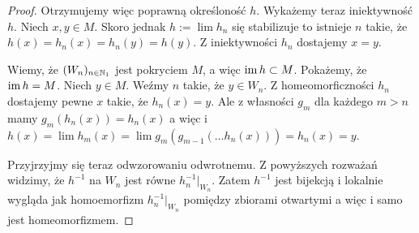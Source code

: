 \begin{thm}
\begin{proof}
    Otrzymujemy więc poprawną określoność $h$. Wykażemy teraz iniektywność $h$. Niech $x, y \in M$. Skoro jednak $h := \lim h_n$ się stabilizuje to istnieje $n$ takie, że $h(x) = h_n(x) = h_n(y) = h(y)$. Z iniektywności $h_n$ dostajemy $x = y$.
    
    Wiemy, że $(W_n)_{n\in{\mathbb{N}_1}}$ jest pokryciem $M$, a więc $\operatorname{im} h \subset M$. Pokażemy, że $\operatorname{im} h = M$. Niech $y\in M$. Weźmy $n$ takie, że $y\in W_n$. Z homeomorficzności $h_n$ dostajemy pewne $x$ takie, że $h_n(x) = y$. Ale z własności $g_m$ dla każdego $m > n$ mamy $g_m(h_n(x)) = h_n(x)$ a więc i $h(x) = \lim h_m(x) = \lim g_m(g_{m-1}(\dots h_n(x))) = h_n(x) = y$.
    
    Przyjrzyjmy się teraz odwzorowaniu odwrotnemu. Z powyższych rozważań widzimy, że $h^{-1}$ na $W_n$ jest równe $h_n^{-1}|_{W_n}$. Zatem $h^{-1}$ jest bijekcją i lokalnie wygląda jak homoemorfizm $h_n^{-1}|_{W_n}$ pomiędzy zbiorami otwartymi a więc i samo jest homeomorfizmem.
  \end{proof}
\end{thm}

 